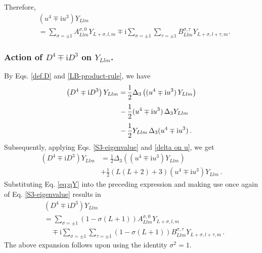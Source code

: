 \documentclass[aps,twocolumn,nofootinbib]{revtex4}
\begin{document}
{\begin{appendix}
Therefore, 
\begin{align}\label{eq:qY}
    &\left(u^4 \mp \mathrm{i}u^3\right)Y_{Llm} \nonumber\\[3pt]
    &= \sum_{\sigma=\pm 1} A^{\sigma,0}_{Llm} Y_{L+\sigma,l,m} \mp \mathrm{i} \sum_{\sigma=\pm 1} \sum_{\tau=\pm 1} B^{\sigma,\tau}_{Llm}Y_{L+\sigma,l+\tau,m}.
\end{align}


\subsubsection{Action of $D^4 \mp \mathrm{i}D^3$ on $Y_{Llm}$.}\label{sec2-61}

By Eqs. \eqref{def.D} and \eqref{LB-product-rule}, we have
\begin{align}\label{eq:Dj-as-grad}
    \left(D^4 \mp \mathrm{i}D^3\right)Y_{Llm} =&\, \frac{1}{2} \Delta_3\left((u^4 \mp \mathrm{i}u^3)\,Y_{Llm}\right) \nonumber\\[3pt]
    - & \,\frac{1}{2} (u^4 \mp \mathrm{i}u^3)\, \Delta_3 Y_{Llm} \nonumber\\[3pt]
    -& \,\frac{1}{2} Y_{Llm}\, \Delta_3(u^4 \mp \mathrm{i}u^3) \vphantom{\Delta_3 \left((u^4 \mp \mathrm{i}u^3)\, Y_{Llm}\right)} \,.
\end{align}
Subsequently, applying Eqs. \eqref{S3-eigenvalue} and \eqref{delta on u}, we get
\begin{align} \label{Dq-Y-final}
    (D^4 \mp \mathrm{i}D^3)Y_{Llm} &= \frac12  \Delta_3\left( (u^4 \mp \mathrm{i}u^3)Y_{Llm} \right) \nonumber\\[3pt]
    & + \frac12 (L(L+2)+3) (u^4 \mp \mathrm{i}u^3)Y_{Llm} \,.
\end{align}
Substituting Eq. \eqref{eq:qY} into the preceding expression and making use once again of Eq. \eqref{S3-eigenvalue} results in
\begin{align}\label{eq:DqY-final}
    &\left(D^4 \mp \mathrm{i}D^3\right)Y_{Llm} \nonumber\\[3pt]
    &=\sum_{\sigma=\pm 1} \left(1-\sigma(L+1)\right) A^{\sigma,0}_{Llm} Y_{L+\sigma,l,m} \nonumber\\[3pt]
    &\quad \mp \mathrm{i} \sum_{\sigma=\pm 1} \sum_{\tau=\pm 1} \left(1-\sigma(L+1)\right) B^{\sigma,\tau}_{Llm} Y_{L+\sigma,l+\tau,m}\,.
\end{align}
The above expansion follows upon using the identity $\sigma^2=1$.



\end{appendix}}
\end{document}
